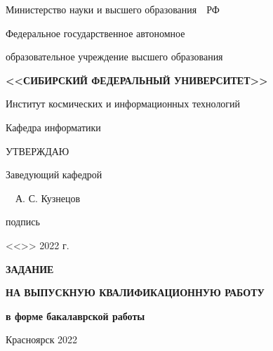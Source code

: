 \begin{spacing}{1}
    \setlength{\parindent}{0cm}

    \centerline{Министерство науки и высшего образования~~РФ}

    \centerline{\small Федеральное государственное автономное}

    \centerline{\small образовательное учреждение высшего образования}

    \centerline{\small\textbf{\MakeUppercase{<<Сибирский Федеральный Университет>>}}}

    \vspace{8pt}

    \centerline{{Институт космических и информационных технологий}}

    \vspace{8pt}

    \centerline{{Кафедра информатики}}


    \vspace{10pt}

    \hfill\begin{minipage}{5.5cm}
        УТВЕРЖДАЮ

        Заведующий кафедрой

        \uline{\hfill}~~А. С. Кузнецов

        \vspace{-4pt}
        {\footnotesize \hspace{2.5ex} подпись}

        <<\uline{\hspace{3ex}}>> \uline{\hspace{9ex}} 2022 г.
    \end{minipage}

    \vfill

    \centerline{\bf ЗАДАНИЕ}
    \centerline{\bf НА ВЫПУСКНУЮ КВАЛИФИКАЦИОННУЮ РАБОТУ}
    \centerline{\bf в форме бакалаврской работы}
    
    \vfill
    \vfill
    \vfill

    \centerline{Красноярск 2022}

\end{spacing}

\thispagestyle{empty}

\clearpage
